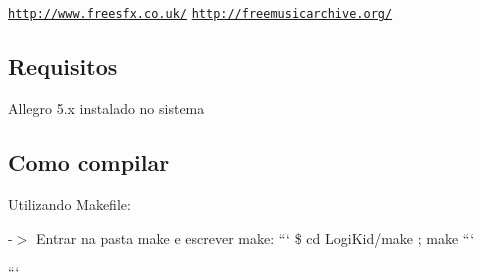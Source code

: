 \begin{quotation}
\subsection*{}



\end{quotation}
\href{http://www.freesfx.co.uk/}{\tt http\-://www.\-freesfx.\-co.\-uk/} \href{http://freemusicarchive.org/}{\tt http\-://freemusicarchive.\-org/}

\subsection*{Requisitos }

Allegro 5.\-x instalado no sistema

\subsection*{Como compilar }

Utilizando Makefile\-:

-\/$>$ Entrar na pasta make e escrever make\-: ``` \$ cd Logi\-Kid/make ; make ```

``` 